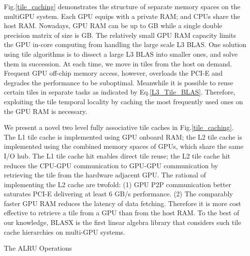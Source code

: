 \documentclass[conference]{IEEEtran}
\begin{document}
Fig.\ref{tile_caching} demonstrates the structure of separate memory spaces on the multiGPU system.
Each GPU equips with a private RAM; and CPUs share the host RAM. Nowadays, GPU
RAM can be up to  GB while a single double precision matrix of size   is  GB. 
The relatively small GPU RAM capacity limits the GPU in-core computing from handling the large scale L3 BLAS. 
One solution using tile algorithms is to dissect a large L3 BLAS into smaller ones, 
and solve them in succession. At each time, we move in tiles from the host on demand. 
Frequent GPU off-chip memory access, however, overloads the PCI-E and degrades the 
performance to be suboptimal. Meanwhile it is possible to reuse certain tiles in separate 
tasks as indicated by Eq.\ref{L3_Tile_BLAS}. Therefore, exploiting the tile 
temporal locality by caching the most frequently used ones on the GPU RAM is necessary.

We present a novel two level fully associative tile caches in Fig.\ref{tile_caching}. 
The L1 tile cache is implemented using GPU onboard RAM; the L2 tile cache is implemented using the combined 
memory spaces of GPUs, which share the same I/O hub. The L1 tile cache hit enables direct tile 
reuse; the L2 tile cache hit reduces the CPU-GPU communication to GPU-GPU communication by 
retrieving the tile from the hardware adjacent GPU. The rational of implementing the L2 cache 
are twofold: 
(1) GPU P2P communication better saturates PCI-E delivering at least 6 GB/s performance. \cite{P2P} 
(2) The comparably faster GPU RAM reduces the latency of data fetching. 
Therefore it is more cost effective to retrieve a tile from a GPU than from the host RAM. 
To the best of our knowledge, BLASX is the first linear algebra library that considers such 
tile cache hierarchies on multi-GPU systems.

\vspace{-0.1in}
\begin{algorithm}
\caption{The ALRU Operations}
\label{AALRU_alg}
\DontPrintSemicolon
{}


\Fn{ (, )}{
     \\
     \\
    
    \\
    
}
\end{algorithm}
\vspace{-0.15in}
\end{document}
